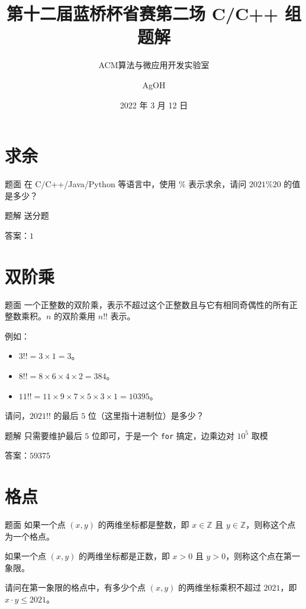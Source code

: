 \documentclass{pptt}
\title{第十二届蓝桥杯省赛第二场 C/C++ 组题解}
\author{ACM算法与微应用开发实验室 \and AgOH}
\date{2022 年 3 月 12 日}
\begin{document}
\maketitle

\section{求余}

\begin{frame}{题面}
    在 C/C++/Java/Python 等语言中，使用 $\%$ 表示求余，请问 $2021 \% 20$ 的值是多少？
\end{frame}

\begin{frame}{题解}
    送分题

    答案：$1$
\end{frame}

\section{双阶乘}

\begin{frame}{题面}
    一个正整数的双阶乘，表示不超过这个正整数且与它有相同奇偶性的所有正整数乘积。$n$ 的双阶乘用 $n!!$ 表示。

    例如：

    \begin{itemize}
        \item $3!! = 3 \times 1 = 3$。
        \item $8!! = 8 \times 6 \times 4 \times 2 = 384$。
        \item $11!! = 11 \times 9 \times 7 \times 5 \times 3 \times 1 = 10395$。
    \end{itemize}

    请问，$2021!!$ 的最后 $5$ 位（这里指十进制位）是多少？
\end{frame}

\begin{frame}{题解}
    只需要维护最后 $5$ 位即可，于是一个 \texttt{for} 搞定，边乘边对 ${10}^5$ 取模

    答案：$59375$
\end{frame}

\section{格点}

\begin{frame}{题面}
    如果一个点 $(x,y)$ 的两维坐标都是整数，即 $x \in \mathbb{Z}$ 且 $y \in \mathbb{Z}$，则称这个点为一个格点。

    如果一个点 $(x,y)$ 的两维坐标都是正数，即 $x>0$ 且 $y>0$，则称这个点在第一象限。

    请问在第一象限的格点中，有多少个点 $(x,y)$ 的两维坐标乘积不超过 $2021$，即 $x \cdot y \leq 2021$。
\end{frame}
\end{document}
